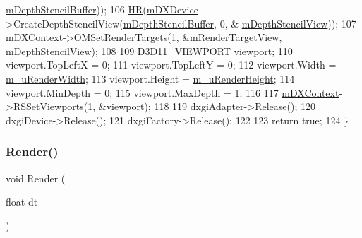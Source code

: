 \begin{DoxyCode}
      \hyperlink{class_comet_engine_1_1_renderer_1_1_comet_engine_d_x_renderer_a738b786f64e4fc6c9a2355f1cf9ae830}{mDepthStencilBuffer}));
106     \hyperlink{_comet_engine_d_x_renderer_8cpp_a924cd8cbf81756869040aed04fd33ca5}{HR}(\hyperlink{class_comet_engine_1_1_renderer_1_1_comet_engine_d_x_renderer_ac606b85554250d2e65a2aa9f10e6aa45}{mDXDevice}->CreateDepthStencilView(\hyperlink{class_comet_engine_1_1_renderer_1_1_comet_engine_d_x_renderer_a738b786f64e4fc6c9a2355f1cf9ae830}{mDepthStencilBuffer}, 0, &
      \hyperlink{class_comet_engine_1_1_renderer_1_1_comet_engine_d_x_renderer_a01cc1c2c77d9af90d45c250d51bcfa35}{mDepthStencilView}));
107     \hyperlink{class_comet_engine_1_1_renderer_1_1_comet_engine_d_x_renderer_ad38b8ad7fd1c747698a96256e75eb635}{mDXContext}->OMSetRenderTargets(1, &\hyperlink{class_comet_engine_1_1_renderer_1_1_comet_engine_d_x_renderer_a109e138c97280440a0955d475441f49d}{mRenderTargetView}, 
      \hyperlink{class_comet_engine_1_1_renderer_1_1_comet_engine_d_x_renderer_a01cc1c2c77d9af90d45c250d51bcfa35}{mDepthStencilView});
108 
109     D3D11\_VIEWPORT viewport;
110     viewport.TopLeftX = 0;
111     viewport.TopLeftY = 0;
112     viewport.Width = \hyperlink{class_comet_engine_1_1_renderer_1_1_comet_engine_d_x_renderer_a3127a8dc19e4bd799fa7e1bfff28de11}{m\_uRenderWidth};
113     viewport.Height = \hyperlink{class_comet_engine_1_1_renderer_1_1_comet_engine_d_x_renderer_af8f780a50f9325d3bad66c1ba49ed533}{m\_uRenderHeight};
114     viewport.MinDepth = 0;
115     viewport.MaxDepth = 1;
116 
117     \hyperlink{class_comet_engine_1_1_renderer_1_1_comet_engine_d_x_renderer_ad38b8ad7fd1c747698a96256e75eb635}{mDXContext}->RSSetViewports(1, &viewport);
118 
119     dxgiAdapter->Release();
120     dxgiDevice->Release();
121     dxgiFactory->Release();
122 
123     \textcolor{keywordflow}{return} \textcolor{keyword}{true};
124 \}
\end{DoxyCode}
\mbox{\label{class_comet_engine_1_1_renderer_1_1_comet_engine_d_x_renderer_ac6fa4f62b984d0d34e785bd960255d71}} 
\subsubsection{\texorpdfstring{Render()}{Render()}}
{\footnotesize\ttfamily void Render (\begin{DoxyParamCaption}\item[{float}]{dt }\end{DoxyParamCaption})}




